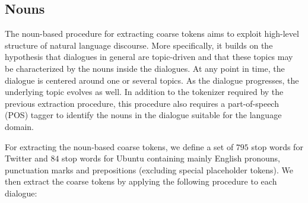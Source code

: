 \documentclass{article}
\begin{document}
\subsection*{Nouns}

The noun-based procedure for extracting coarse tokens aims to exploit high-level structure of natural language discourse. More specifically, it builds on the hypothesis that dialogues in general are topic-driven and that these topics may be characterized by the nouns inside the dialogues. At any point in time, the dialogue is centered around one or several topics. As the dialogue progresses, the underlying topic evolves as well. In addition to the tokenizer required by the previous extraction procedure, this procedure also requires a part-of-speech (POS) tagger to identify the nouns in the dialogue suitable for the language domain.

For extracting the noun-based coarse tokens, we define a set of $795$ stop words for Twitter and $84$ stop words for Ubuntu containing mainly English pronouns, punctuation marks and prepositions (excluding special placeholder tokens). We then extract the coarse tokens by applying the following procedure to each dialogue:
\end{document}
